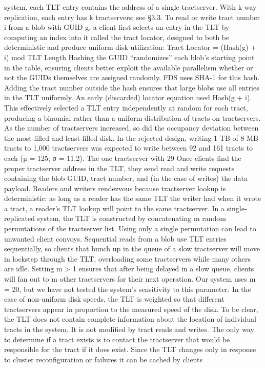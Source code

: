 system, each TLT entry contains the address of a single tractserver. With k-way replication, each entry has k
tractservers; see §3.3.
To read or write tract number i from a blob with GUID
g, a client first selects an entry in the TLT by computing
an index into it called the tract locator, designed to both
be deterministic and produce uniform disk utilization:
Tract Locator = (Hash(g) + i) mod TLT Length
Hashing the GUID “randomizes” each blob’s starting
point in the table, ensuring clients better exploit the available parallelism whether or not the GUIDs themselves
are assigned randomly. FDS uses SHA-1 for this hash.
Adding the tract number outside the hash ensures that
large blobs use all entries in the TLT uniformly. An early
(discarded) locator equation used Hash(g + i). This effectively selected a TLT entry independently at random
for each tract, producing a binomial rather than a uniform distribution of tracts on tractservers. As the number
of tractservers increased, so did the occupancy deviation
between the most-filled and least-filled disk. In the rejected design, writing 1 TB of 8 MB tracts to 1,000 tractservers was expected to write between 92 and 161 tracts
to each (µ = 125; σ = 11.2). The one tractserver with
29%
Once clients find the proper tractserver address in the
TLT, they send read and write requests containing the
blob GUID, tract number, and (in the case of writes) the
data payload. Readers and writers rendezvous because
tractserver lookup is deterministic: as long as a reader
has the same TLT the writer had when it wrote a tract, a
reader’s TLT lookup will point to the same tractserver.
In a single-replicated system, the TLT is constructed
by concatenating m random permutations of the tractserver list. Using only a single permutation can lead to
unwanted client convoys. Sequential reads from a blob
use TLT entries sequentially, so clients that bunch up in
the queue of a slow tractserver will move in lockstep
through the TLT, overloading some tractservers while
many others are idle. Setting m > 1 ensures that after
being delayed in a slow queue, clients will fan out to m
other tractservers for their next operation. Our system
uses m = 20, but we have not tested the system’s sensitivity to this parameter.
In the case of non-uniform disk speeds, the TLT is
weighted so that different tractservers appear in proportion to the measured speed of the disk.
To be clear, the TLT does not contain complete information about the location of individual tracts in the system. It is not modified by tract reads and writes. The only
way to determine if a tract exists is to contact the tractserver that would be responsible for the tract if it does
exist. Since the TLT changes only in response to cluster reconfiguration or failures it can be cached by clients

